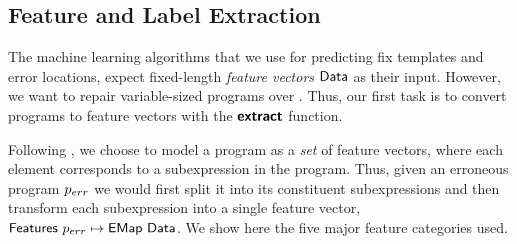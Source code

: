 \begin{comment}
to be used
and maps each subexpression of the original erroneous
program to a boolean vector. The first entry refers to the error locations that
the user fixed, \ie whether a subexpression changed in a program pair. Those
locations are acquired through the $\diffsym$ function. The rest of the boolean
vector has at most one $\etrue$ value, and corresponds to the fix template $\T$
that was used to repair that subexpression.

The $\extractsym$ function is applied to all the dataset program pairs, and all
subexpression feature and label vectors are then grouped together into one
larger \emph{training} dataset. The training dataset is used by the $\trainsym$
function to produce two predictive models, $\Model$ and $\ModelT$. $\Model$ is
used for error localization and $\ModelT$ for predicting fix templates.

Finally, the $\predictsym$ function produces an error location confidence score
$\Conf$ and confidence scores $\Tmap{\Conf}$ for each of the selected fix
templates for a specific subexpression in a new program $e$ that we want to
repair. The $\predictsym$ function expects as input the two generated
predictive models and a new feature vector $\V$, that corresponds to a
subexpression's feature vector acquired again by $\extractsym$. It is then
applied to each subexpression in $e$'s type-error slice (TODO: ref) and
generates a mapping from program expressions to confidence scores $\Emap{(\Conf
\times \Tmap{\Conf})}$ as output of the top-level function $\repairsym$.
\end{comment}


\subsection{Feature and Label Extraction}
\label{subsec:extract}
The machine learning algorithms that we use for predicting fix templates and
error locations, expect fixed-length \emph{feature vectors} $\mathsf{Data}$ as their
input. However, we want to repair variable-sized programs over \lang. Thus, our
first task is to convert programs to feature vectors with the $\bm{\mathsf{extract}}$
function.

Following \citep{Seidel:2017}, we choose to model a program as a \emph{set} of
feature vectors, where each element corresponds to a subexpression in the
program. Thus, given an erroneous program $p_{err}$ we would first split it into
its constituent subexpressions and then transform each subexpression into a
single feature vector, \ie $\mathsf{Features}\ p_{err} \mapsto \mathsf{EMap}\ \mathsf{Data}$. We show
here the five major feature categories used.


